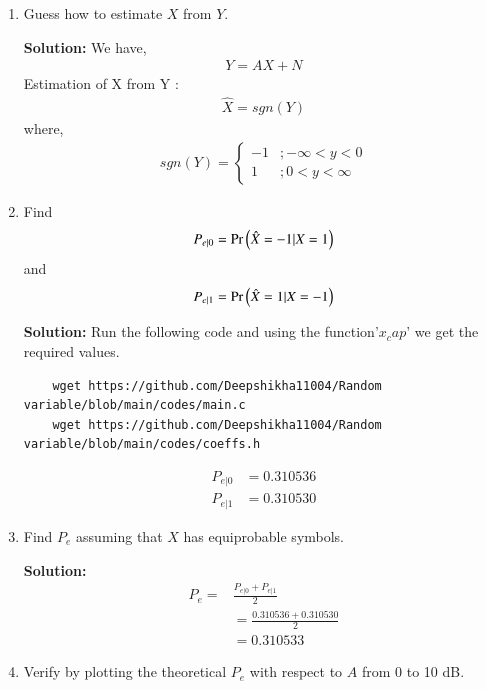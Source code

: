 \documentclass[journal,12pt,twocolumn]{IEEEtran}
\renewcommand\thesection{\arabic{section}}
\begin{document}
\begin{enumerate}[label=\thesection.\arabic*
,ref=\thesection.\theenumi]
\item Guess how to estimate $X$ from $Y$.


\textbf{Solution:}
We have,
\begin{align}
    Y=AX+N
\end{align}
Estimation of X from Y :
\begin{align}
    \hat{X}=sgn(Y)
\end{align}
where,
\begin{align}
    sgn(Y)=
    \begin{cases}
       -1 & ;-\infty<y<0\\
        1 & ; 0<y<\infty
    \end{cases} 
\end{align}

\item
\label{ml-ch4_sim}
Find 
\begin{equation}
	P_{e|0} = \Pr\left(\hat{X} = -1|X=1\right)
\end{equation}
and 
\begin{equation}
	P_{e|1} = \Pr\left(\hat{X} = 1|X=-1\right)
\end{equation}

\textbf{Solution:}
Run the following code and using the function'$x_cap$' we get the required values.
\begin{lstlisting}
    wget https://github.com/Deepshikha11004/Random variable/blob/main/codes/main.c
    wget https://github.com/Deepshikha11004/Random variable/blob/main/codes/coeffs.h

\end{lstlisting}
\begin{align}
    P_{e|0}&=0.310536\\
    P_{e|1}&=0.310530
\end{align}

%
\item Find $P_e$ assuming that $X$ has equiprobable symbols.


\textbf{Solution:} 
      \begin{align}
        P_e=&\frac{P_{e|0}+P_{e|1}}{2}\\
        &=\frac{0.310536+0.310530}{2}\\
        &=0.310533
      \end{align}
\item
Verify by plotting  the theoretical $P_e$ with respect to $A$ from 0 to 10 dB.  



\end{enumerate}
\end{document}
